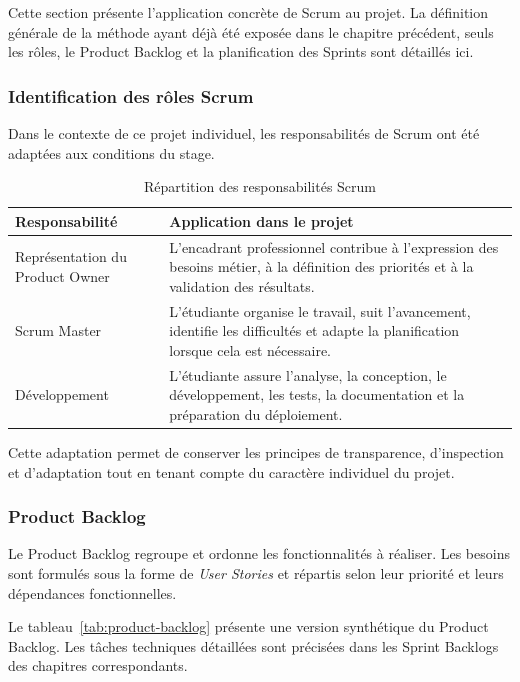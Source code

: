 Cette section présente l’application concrète de Scrum au projet. La définition générale de la méthode ayant déjà été exposée dans le chapitre précédent, seuls les rôles, le Product Backlog et la planification des Sprints sont détaillés ici.

\subsubsection{Identification des rôles Scrum}

Dans le contexte de ce projet individuel, les responsabilités de Scrum ont été adaptées aux conditions du stage.

\begin{table}[H]
\centering
\caption{Répartition des responsabilités Scrum}
\label{tab:roles-scrum}
\small
\begin{tabularx}{\textwidth}{|p{3.2cm}|X|}
\hline
\textbf{Responsabilité} & \textbf{Application dans le projet} \\
\hline

Représentation du Product Owner &
L’encadrant professionnel contribue à l’expression des besoins métier, à la définition des priorités et à la validation des résultats. \\
\hline

Scrum Master &
L’étudiante organise le travail, suit l’avancement, identifie les difficultés et adapte la planification lorsque cela est nécessaire. \\
\hline

Développement &
L’étudiante assure l’analyse, la conception, le développement, les tests, la documentation et la préparation du déploiement. \\
\hline
\end{tabularx}
\end{table}

Cette adaptation permet de conserver les principes de transparence, d’inspection et d’adaptation tout en tenant compte du caractère individuel du projet.

\subsubsection{Product Backlog}

Le Product Backlog regroupe et ordonne les fonctionnalités à réaliser. Les besoins sont formulés sous la forme de \textit{User Stories} et répartis selon leur priorité et leurs dépendances fonctionnelles.

Le tableau~\ref{tab:product-backlog} présente une version synthétique du Product Backlog. Les tâches techniques détaillées sont précisées dans les Sprint Backlogs des chapitres correspondants.

